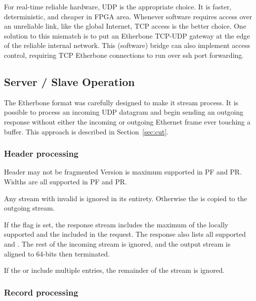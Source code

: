 \documentclass{article}
\begin{document}
For real-time reliable hardware, UDP is the appropriate choice.
It is faster, deterministic, and cheaper in FPGA area.
Whenever software requires access over an unreliable link,
like the global Internet,
TCP access is the better choice.
One solution to this mismatch is to put an Etherbone TCP-UDP gateway
at the edge of the reliable internal network.
This (software) bridge can also implement access control,
requiring TCP Etherbone connections to run over ssh port forwarding.

\subsection{Server / Slave Operation}

The Etherbone format was carefully designed to make it stream process.
It is possible to process an incoming UDP datagram and
begin sending an outgoing response 
without either the incoming or outgoing Ethernet frame ever touching a buffer.
This approach is described in Section~\ref{sec:cut}.

\subsubsection{Header processing}

Header may not be fragmented
Version is maximum supported in PF and PR.
Widths are all supported in PF and PR.

Any stream with invalid  is ignored in its entirety.
Otherwise the  is copied to the outgoing stream.

If the  flag is set,
the response stream includes the maximum of the locally supported
 and the  included in the request.
The response also lists all supported  and .
The rest of the incoming stream is ignored,
and the output stream is aligned to 64-bits then terminated.

If the  or  include multiple entries, 
the remainder of the stream is ignored.

\subsubsection{Record processing}
\end{document}
